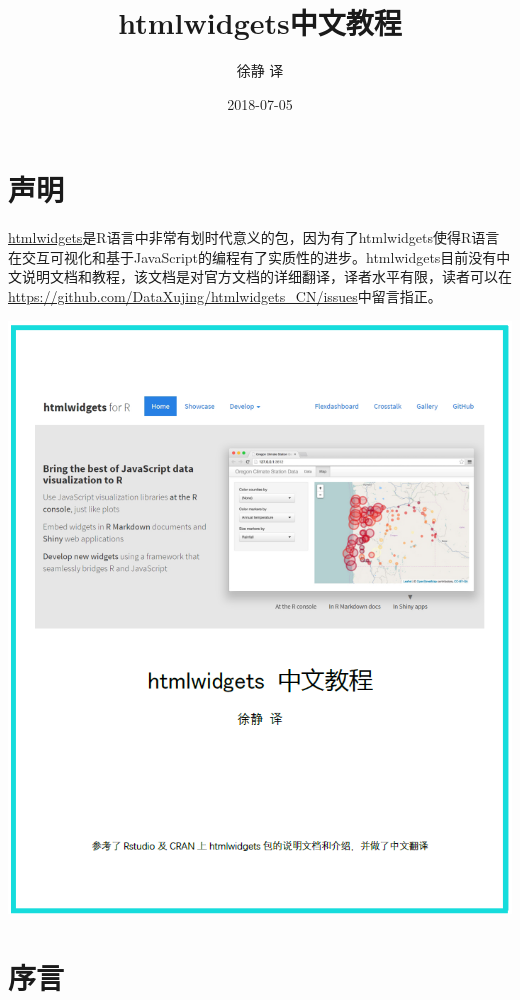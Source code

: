 \documentclass[]{book}
\title{htmlwidgets中文教程}
\author{徐静 译}
\date{2018-07-05}
\theoremstyle{definition}
\theoremstyle{definition}
\theoremstyle{definition}
\theoremstyle{remark}
\begin{document}
\maketitle

{
\setcounter{tocdepth}{1}
\tableofcontents
}
\chapter*{声明}

\href{https://CRAN.R-project.org/package=htmlwidgets}{htmlwidgets}是R语言中非常有划时代意义的包，因为有了htmlwidgets使得R语言在交互可视化和基于JavaScript的编程有了实质性的进步。htmlwidgets目前没有中文说明文档和教程，该文档是对官方文档的详细翻译，译者水平有限，读者可以在\url{https://github.com/DataXujing/htmlwidgets_CN/issues}中留言指正。

\begin{center}\includegraphics[width=9.88in,height=0.7\textheight]{pic/cover} \end{center}

\chapter*{序言}
\end{document}
